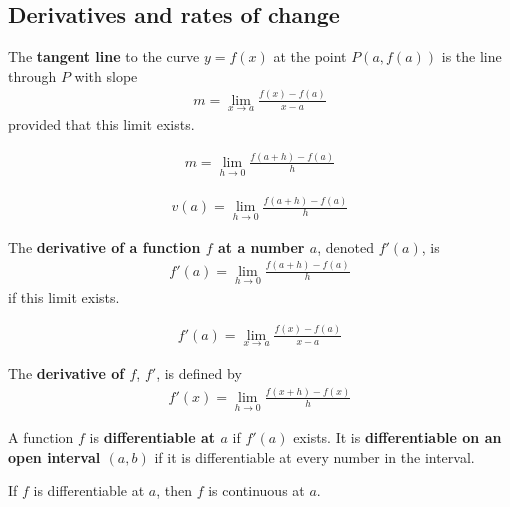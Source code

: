 \documentclass{article}
\begin{document}
\subsection{Derivatives and rates of change}
\begin{definition}
    The \textbf{tangent line} to the curve $y=f(x)$ at the point $P(a, f(a))$ is the line through $P$ with slope
    \begin{align*}
        m=\lim_{x\to a}\frac{f(x)-f(a)}{x-a}
    \end{align*}
    provided that this limit exists.
\end{definition}
\begin{theorem}
    \begin{align*}
        m=\lim_{h\to 0}\frac{f(a + h)-f(a)}{h}
    \end{align*}
\end{theorem}
\begin{theorem}
    \begin{align*}
        v(a)=\lim_{h\to 0}\frac{f(a+h)-f(a)}{h}
    \end{align*}
\end{theorem}
\begin{definition}
    The \textbf{derivative of a function $f$ at a number $a$}, denoted $f'(a)$, is
    \begin{align*}
        f'(a)=\lim_{h\to 0}\frac{f(a+h)-f(a)}{h}
    \end{align*}
    if this limit exists.
\end{definition}
\begin{theorem}
    \begin{align*}
        f'(a)=\lim_{x\to a}\frac{f(x)-f(a)}{x-a}
    \end{align*}
\end{theorem}
\begin{definition}
    The \textbf{derivative of $f$}, $f'$, is defined by
    \begin{align*}
        f'(x)=\lim_{h\to 0}\frac{f(x+h)-f(x)}{h}
    \end{align*}
\end{definition}
\begin{definition}
    A function $f$ is \textbf{differentiable at $a$} if $f'(a)$ exists. It is \textbf{differentiable on an open interval $(a,b)$} if it is differentiable at every number in the interval.
\end{definition}
\begin{theorem}
    If $f$ is differentiable at $a$, then $f$ is continuous at $a$.
\end{theorem}
\end{document}
